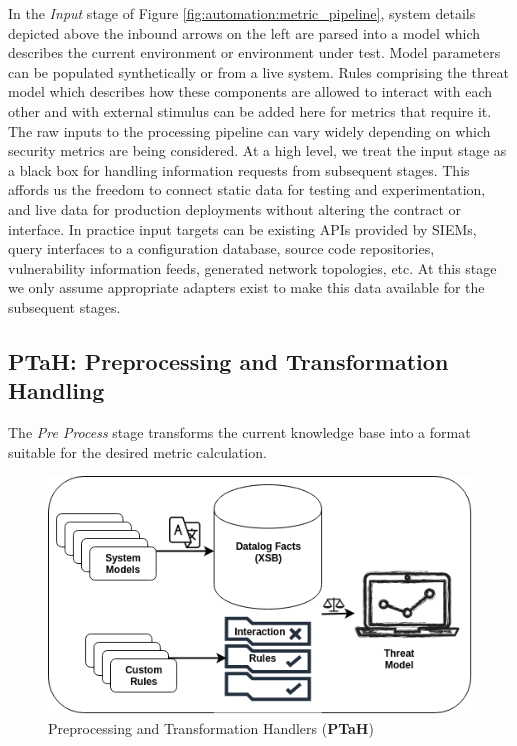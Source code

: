 In the \textit{Input} stage of Figure \ref{fig:automation:metric_pipeline}, system details depicted above the inbound arrows on the left are parsed into a model which describes the current environment or environment under test. Model parameters can be populated synthetically or from a live system. Rules comprising the threat model which describes how these components are allowed to interact with each other and with external stimulus can be added here for metrics that require it. The raw inputs to the processing pipeline can vary widely depending on which security metrics are being considered. At a high level, we treat the input stage as a black box for handling information requests from subsequent stages. This affords us the freedom to connect static data for testing and experimentation, and live data for production deployments without altering the contract or interface. In practice input targets can be existing APIs provided by SIEMs, query interfaces to a configuration database, source code repositories, vulnerability information feeds, generated network topologies, etc. At this stage we only assume appropriate adapters exist to make this data available for the subsequent stages.

\subsection{PTaH: Preprocessing and Transformation Handling} \label{sec:automation:methodology:preprocess}

The \textit{Pre Process} stage transforms the current knowledge base into a format suitable for the desired metric calculation. 


\begin{figure}[ht]
\centering
\includegraphics[width=.5\linewidth]{resource/img/ch_benchmarking/secmet_ptah/Ptah_archs.png}
\caption{Preprocessing and Transformation Handlers (\textbf{PTaH})}
\label{fig:automation:ptah_arch}
\end{figure} 

